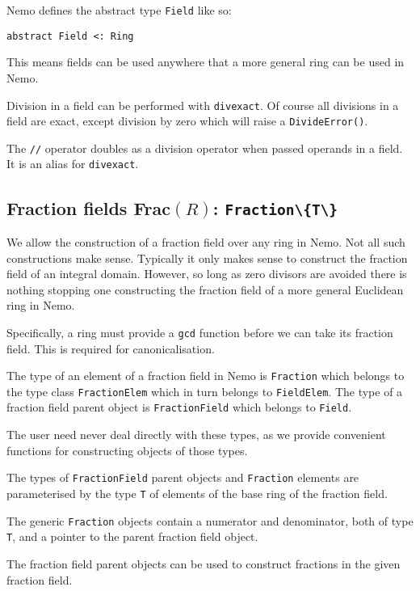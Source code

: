 \documentclass[a4paper,10pt]{article}
\newcommand{\code}{\lstinline}
\begin{document}
Nemo defines the abstract type \code{Field} like so:

\begin{lstlisting}
abstract Field <: Ring
\end{lstlisting}

This means fields can be used anywhere that a more general ring can be used
in Nemo.

Division in a field can be performed with \code{divexact}. Of course all
divisions in a field are exact, except division by zero which will raise
a \code{DivideError()}.

The \code{//} operator doubles as a division operator when passed operands
in a field. It is an alias for \code{divexact}.

\subsection{Fraction fields Frac$(R)$: \code|Fraction\{T\}|}

We allow the construction of a fraction field over any ring in Nemo. Not all
such constructions make sense. Typically it only makes sense to construct the
fraction field of an integral domain. However, so long as zero divisors are
avoided there is nothing stopping one constructing the fraction field of a
more general Euclidean ring in Nemo.

Specifically, a ring must provide a \code{gcd} function before we can take its
fraction field. This is required for canonicalisation.

The type of an element of a fraction field in Nemo is \code{Fraction} which
belongs to the type class \code{FractionElem} which in turn belongs to
\code{FieldElem}. The type of a fraction field parent object is
\code{FractionField} which belongs to \code{Field}.

The user need never deal directly with these types, as we provide convenient
functions for constructing objects of those types.

The types of \code{FractionField} parent objects and \code{Fraction} elements
are parameterised by the type \code{T} of elements of the base ring of the
fraction field.

The generic \code{Fraction} objects contain a numerator and denominator, both
of type \code{T}, and a pointer to the parent fraction field object.

The fraction field parent objects can be used to construct fractions in the
given fraction field.
\end{document}
